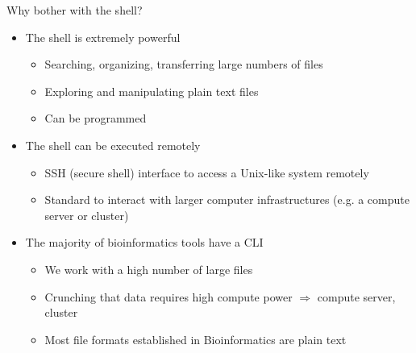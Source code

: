 \documentclass[aspectratio=1610]{beamer}
\begin{document}
\begin{frame}[c]{Why bother with the shell?}
    \begin{itemize}[<+->]\setlength\itemsep{1em}
        \item The shell is extremely powerful

            \begin{itemize}[<.->]
                \item Searching, organizing, transferring large numbers of files
                \item Exploring and manipulating plain text files
                \item Can be programmed
            \end{itemize}

        \item The shell can be executed remotely

            \begin{itemize}[<.->]
                \item SSH (secure shell) interface to access a Unix-like system remotely
                \item Standard to interact with larger computer infrastructures (e.g. a compute
                    server or cluster)
            \end{itemize}

        \item The majority of bioinformatics tools have a CLI
            \begin{itemize}[<.->]
                \item We work with a high number of large files
                \item Crunching that data requires high compute power $\Rightarrow$ compute server,
                    cluster
                \item Most file formats established in Bioinformatics are plain text
            \end{itemize}
    \end{itemize}
\end{frame}

\end{document}
